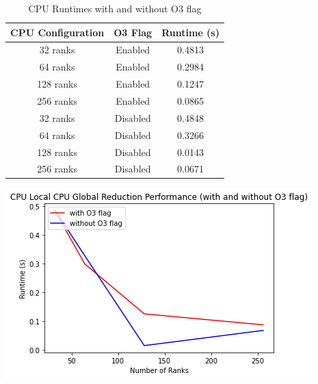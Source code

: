 \documentclass{article}
\begin{document}
  \begin{table}[h!]
  \centering
  \begin{tabular}{|c|c|c|}
  \hline
  \textbf{CPU Configuration} & \textbf{O3 Flag} & \textbf{Runtime (s)} \\ \hline
  32 ranks & Enabled & 0.4813 \\ \hline
  64 ranks & Enabled & 0.2984 \\ \hline
  128 ranks & Enabled & 0.1247 \\ \hline
  256 ranks & Enabled & 0.0865 \\ \hline
  32 ranks & Disabled & 0.4848 \\ \hline
  64 ranks & Disabled & 0.3266 \\ \hline
  128 ranks & Disabled & 0.0143 \\ \hline
  256 ranks & Disabled & 0.0671 \\ \hline
  \end{tabular}
  \caption{CPU Runtimes with and without O3 flag}
  \end{table}

  \includegraphics[width=\textwidth]{cpu_local.png}
\end{document}
